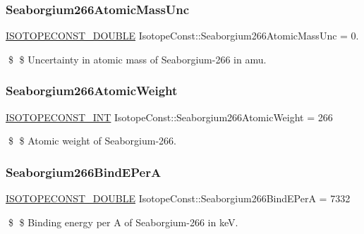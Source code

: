 \subsubsection{\texorpdfstring{Seaborgium266\+Atomic\+Mass\+Unc}{Seaborgium266AtomicMassUnc}}
{\footnotesize\ttfamily \mbox{\hyperlink{group___isotope_const-_macros_ga8f45a7272ce02c0b4c65c44636ed719a}{I\+S\+O\+T\+O\+P\+E\+C\+O\+N\+S\+T\+\_\+\+D\+O\+U\+B\+LE}} Isotope\+Const\+::\+Seaborgium266\+Atomic\+Mass\+Unc = 0.}

\$ \$ Uncertainty in atomic mass of Seaborgium-\/266 in amu. \mbox{\label{group___isotope_const-_seaborgium-_sg266_ga9cb291a3b7be3eb2883cb49d7f8509eb}} 
\subsubsection{\texorpdfstring{Seaborgium266\+Atomic\+Weight}{Seaborgium266AtomicWeight}}
{\footnotesize\ttfamily \mbox{\hyperlink{group___isotope_const-_macros_ga5f18360b3e99483a35c32d789e62621c}{I\+S\+O\+T\+O\+P\+E\+C\+O\+N\+S\+T\+\_\+\+I\+NT}} Isotope\+Const\+::\+Seaborgium266\+Atomic\+Weight = 266}

\$ \$ Atomic weight of Seaborgium-\/266. \mbox{\label{group___isotope_const-_seaborgium-_sg266_ga93a57a881a17fb36afb5b2f66c718cbc}} 
\subsubsection{\texorpdfstring{Seaborgium266\+Bind\+E\+PerA}{Seaborgium266BindEPerA}}
{\footnotesize\ttfamily \mbox{\hyperlink{group___isotope_const-_macros_ga8f45a7272ce02c0b4c65c44636ed719a}{I\+S\+O\+T\+O\+P\+E\+C\+O\+N\+S\+T\+\_\+\+D\+O\+U\+B\+LE}} Isotope\+Const\+::\+Seaborgium266\+Bind\+E\+PerA = 7332}

\$ \$ Binding energy per A of Seaborgium-\/266 in keV. \mbox{\label{group___isotope_const-_seaborgium-_sg266_gafc9faa5a3b4df938ec2469764fbb70aa}} 
